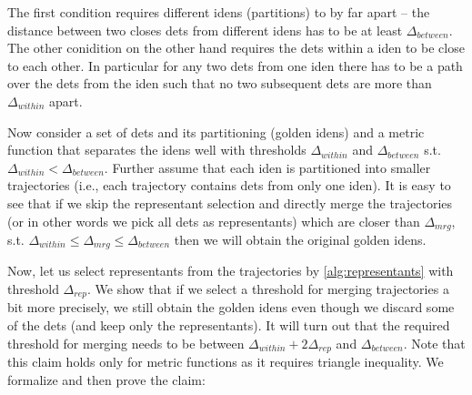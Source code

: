 The first condition requires different \glspl{iden} (partitions) to by far apart -- the distance between two closes \glspl{det} from different \glspl{iden} has to be at least $\Delta_{between}$. The other conidition on the other hand requires the \glspl{det} within a \gls{iden} to be close to each other. In particular for any two \glspl{det} from one \gls{iden} there has to be a path over the \glspl{det} from the \gls{iden} such that no two subsequent \glspl{det} are more than $\Delta_{within}$ apart.

Now consider a set of \glspl{det} and its partitioning (golden \glspl{iden}) and a metric function that separates the \glspl{iden} well with thresholds $\Delta_{within}$ and $\Delta_{between}$ s.t. $\Delta_{within} < \Delta_{between}$. Further assume that each \gls{iden} is partitioned into smaller trajectories (i.e., each trajectory contains \glspl{det} from only one \gls{iden}). It is easy to see that if we skip the representant selection and directly merge the trajectories (or in other words we pick all \glspl{det} as representants) which are closer than $\Delta_{mrg}$, s.t. $\Delta_{within} \leq \Delta_{mrg} \leq \Delta_{between}$ then we will obtain the original golden \glspl{iden}.

Now, let us select representants from the trajectories by \autoref{alg:representants} with threshold $\Delta_{rep}$. We show that if we select a threshold for merging trajectories a bit more precisely, we still obtain the golden \glspl{iden} even though we discard some of the \glspl{det} (and keep only the representants). It will turn out that the required threshold for merging needs to be between $\Delta_{within} + 2\Delta_{rep}$ and $\Delta_{between}$. Note that this claim holds only for metric functions as it requires triangle inequality. We formalize and then prove the claim:



